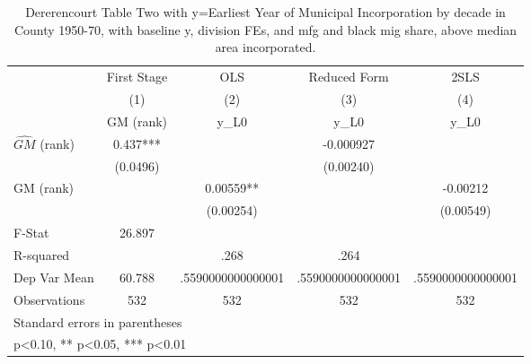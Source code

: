 \begin{table}[htbp]\centering
\def\sym#1{\ifmmode^{#1}\else\(^{#1}\)\fi}
\caption{Dererencourt Table Two with y=Earliest Year of Municipal Incorporation by decade in County 1950-70, with baseline y, division FEs, and mfg and black mig share, above median area incorporated.}
\begin{tabular}{l*{4}{c}}
\toprule
                    & First Stage   &         OLS   &Reduced Form   &        2SLS   \\
                    &\multicolumn{1}{c}{(1)}&\multicolumn{1}{c}{(2)}&\multicolumn{1}{c}{(3)}&\multicolumn{1}{c}{(4)}\\
                    &\multicolumn{1}{c}{GM  (rank)}&\multicolumn{1}{c}{y\_L0}&\multicolumn{1}{c}{y\_L0}&\multicolumn{1}{c}{y\_L0}\\
\midrule
$\hat{GM}$ (rank)   &       0.437***&               &   -0.000927   &               \\
                    &    (0.0496)   &               &   (0.00240)   &               \\
\addlinespace
GM  (rank)          &               &     0.00559** &               &    -0.00212   \\
                    &               &   (0.00254)   &               &   (0.00549)   \\
\midrule
F-Stat              &      26.897   &               &               &               \\
R-squared           &               &        .268   &        .264   &               \\
Dep Var Mean        &      60.788   &.5590000000000001   &.5590000000000001   &.5590000000000001   \\
Observations        &         532   &         532   &         532   &         532   \\
\bottomrule
\multicolumn{5}{l}{\footnotesize Standard errors in parentheses}\\
\multicolumn{5}{l}{\footnotesize * p<0.10, ** p<0.05, *** p<0.01}\\
\end{tabular}
\end{table}
